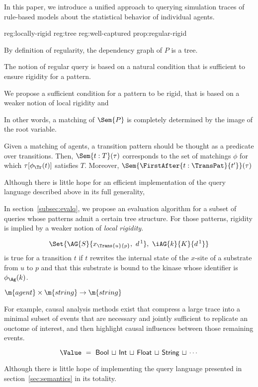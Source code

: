 
 In this paper, we introduce a unified approach to querying
  simulation traces of rule-based models about the statistical
  behavior of individual agents.

{reg:locally-rigid}
{reg:tree}
{reg:well-captured}
{prop:regular-rigid}

By definition of regularity,
the dependency graph of $P$ is a tree.

The notion of regular query is based on a natural condition that is
sufficient to ensure rigidity for a pattern.

We propose a sufficient condition for a pattern to be rigid, that is based
on a weaker notion of local rigidity and


In other words, a matching of $\Sem{P}$ is completely determined by
the image of the root variable.


Given a matching of agents, a transition pattern should be thought as
a predicate over transitions. Then, $\Sem{t:T}(\tau)$ corresponds to
the set of matchings $\phi$ for which $\tau[\phi_{\Tr}(t)]$ satisfies
$T$. Moreover, $\Sem{\FirstAfter{t:\TransPat}{t'}}(\tau)$

Although there is little hope for an efficient implementation of the
query language described above in its full generality, 

In section~\ref{subsec:evalq}, we propose an evaluation algorithm for
a subset of queries whose patterns admit a certain tree structure. For
those patterns, rigidity is implied by a weaker notion of \emph{local
  rigidity}.

\[ \Set{ \AG{S}{x_{\Trans{u}{p}},\ d^{\,1}},\ \iAG{k}{K}{d^{\,1}} } \]
is true for a transition $t$ if $t$ rewrites the internal state of the
$x$-site of a substrate from $u$ to $p$ and that this substrate is
bound to the kinase whose identifier is $\phi_{\Ag}(k)$.

$\m{agent} \times \m{string} \to \m{string}$

For example, causal analysis methods exist
\cite{DanosEtAl-CONCUR07,DBLP:conf/fsttcs/DanosFFHH12} that compress a
large trace into a minimal subset of events that are necessary and
jointly sufficient to replicate an ouctome of interest, and then
highlight causal influences between those remaining events.

\[ \Value \ = \ \textsf{Bool} \,\sqcup\, \textsf{Int} \,\sqcup\,
  \textsf{Float} \,\sqcup\, \textsf{String} \,\sqcup\, \cdots \]


Although there is little hope of implementing the query language
presented in section~\ref{sec:semantics} in its totality.


